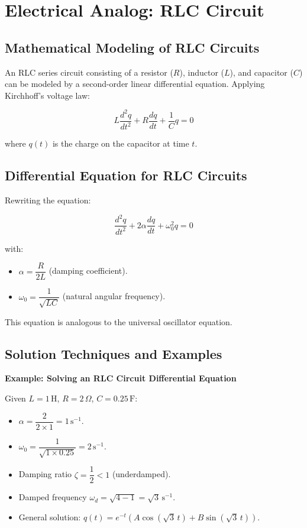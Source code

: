 \documentclass[12pt,a4paper]{article}
\begin{document}
\section{Electrical Analog: RLC Circuit}

\subsection{Mathematical Modeling of RLC Circuits}

An RLC series circuit consisting of a resistor (\( R \)), inductor (\( L \)), and capacitor (\( C \)) can be modeled by a second-order linear differential equation. Applying Kirchhoff's voltage law:

\[
L \frac{d^2 q}{dt^2} + R \frac{dq}{dt} + \dfrac{1}{C} q = 0
\]

where \( q(t) \) is the charge on the capacitor at time \( t \).

\subsection{Differential Equation for RLC Circuits}

Rewriting the equation:

\[
\frac{d^2 q}{dt^2} + 2 \alpha \frac{dq}{dt} + \omega_0^2 q = 0
\]

with:

\begin{itemize}
    \item \( \alpha = \dfrac{R}{2L} \) (damping coefficient).
    \item \( \omega_0 = \dfrac{1}{\sqrt{LC}} \) (natural angular frequency).
\end{itemize}

This equation is analogous to the universal oscillator equation.

\subsection{Solution Techniques and Examples}

\textbf{Example: Solving an RLC Circuit Differential Equation}

Given \( L = 1 \, \text{H} \), \( R = 2 \, \Omega \), \( C = 0.25 \, \text{F} \):

\begin{itemize}
    \item \( \alpha = \dfrac{2}{2 \times 1} = 1 \, \text{s}^{-1} \).
    \item \( \omega_0 = \dfrac{1}{\sqrt{1 \times 0.25}} = 2 \, \text{s}^{-1} \).
    \item Damping ratio \( \zeta = \dfrac{1}{2} < 1 \) (underdamped).
    \item Damped frequency \( \omega_d = \sqrt{4 - 1} = \sqrt{3} \, \text{s}^{-1} \).
    \item General solution: \( q(t) = e^{-t} \left( A \cos\left( \sqrt{3} \, t \right) + B \sin\left( \sqrt{3} \, t \right) \right) \).
\end{itemize}
\end{document}
